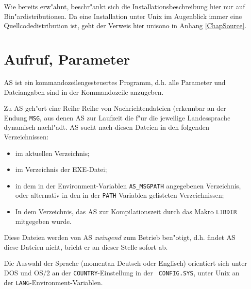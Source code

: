 \documentclass[12pt,a4paper,twoside]{report}
\begin{document}
Wie bereits erw"ahnt, beschr"ankt sich die Installationsbeschreibung hier
nur auf Bin"ardistributionen.  Da eine Installation unter Unix
 im Augenblick immer eine Quellcodedistribution ist,
geht der Verweis hier unisono in Anhang \ref{ChapSource}.


\section{Aufruf, Parameter}\label{SectCallConvention}

AS ist ein kommandozeilengesteuertes Programm, d.h. alle Parameter
und Dateiangaben sind in der Kommandozeile anzugeben.

Zu AS geh"ort eine Reihe Reihe von Nachrichtendateien (erkennbar an der
Endung {\tt MSG}, aus denen AS zur Laufzeit die f"ur die jeweilige
Landessprache dynamisch nachl"adt.  AS sucht nach diesen Dateien in den
folgenden Verzeichnissen:
\begin{itemize}
\item{im aktuellen Verzeichnis;}
\item{im Verzeichnis der EXE-Datei;}
\item{in dem in der Environment-Variablen {\tt AS\_MSGPATH} angegebenen
      Verzeichnis, oder alternativ in den in der {\tt PATH}-Variablen
      gelisteten Verzeichnissen;}
\item{In dem Verzeichnis, das AS zur Kompilationszeit durch das
      Makro {\tt LIBDIR} mitgegeben wurde.}
\end{itemize}
Diese Dateien werden von AS {\em zwingend} zum Betrieb ben"otigt, d.h.
findet AS diese Dateien nicht, bricht er an dieser Stelle sofort ab.

Die Auswahl der Sprache (momentan Deutsch oder Englisch) orientiert sich
unter DOS und OS/2 an der {\tt COUNTRY}-Einstellung in der {\tt
CONFIG.SYS}, unter Unix an der {\tt LANG}-Environment-Variablen.
\end{document}
